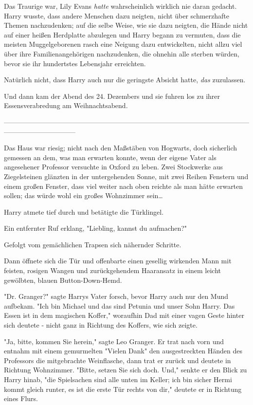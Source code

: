 {Das Traurige war, Lily Evans \emph{hatte} wahrscheinlich wirklich nie daran gedacht. Harry wusste, dass andere Menschen dazu neigten, nicht über schmerzhafte Themen nachzudenken; auf die selbe Weise, wie sie dazu neigten, die Hände nicht auf einer heißen Herdplatte abzulegen und Harry begann zu vermuten, dass die meisten Muggelgeborenen rasch eine Neigung dazu entwickelten, nicht allzu viel über ihre Familienangehörigen nachzudenken, die ohnehin alle sterben würden, bevor sie ihr hundertstes Lebensjahr erreichten.

Natürlich nicht, dass Harry auch nur die geringste Absicht hatte, \emph{das} zuzulassen.

Und dann kam der Abend des 24. Dezembers und sie fuhren los zu ihrer Essensverabredung am Weihnachtsabend.

--------------------------------------------------------------------------------------------------------------------------------------------

Das Haus war riesig; nicht nach den Maßstäben von Hogwarts, doch sicherlich gemessen an dem, was man erwarten konnte, wenn der eigene Vater als angesehener Professor versuchte in Oxford zu leben. Zwei Stockwerke aus Ziegelsteinen glänzten in der untergehenden Sonne, mit zwei Reihen Fenstern und einem großen Fenster, dass viel weiter nach oben reichte als man hätte erwarten sollen; das würde wohl ein großes Wohnzimmer sein…

Harry atmete tief durch und betätigte die Türklingel.

Ein entfernter Ruf erklang, "Liebling, kannst du aufmachen?"

Gefolgt vom gemächlichen Trapsen sich nähernder Schritte.

Dann öffnete sich die Tür und offenbarte einen gesellig wirkenden Mann mit feisten, rosigen Wangen und zurückgehendem Haaransatz in einem leicht gewölbten, blauen Button-Down-Hemd.

"Dr. Granger?" sagte Harrys Vater forsch, bevor Harry auch nur den Mund aufbekam. "Ich bin Michael und das sind Petunia und unser Sohn Harry. Das Essen ist in dem magischen Koffer," woraufhin Dad mit einer vagen Geste hinter sich deutete - nicht ganz in Richtung des Koffers, wie sich zeigte.

"Ja, bitte, kommen Sie herein," sagte Leo Granger. Er trat nach vorn und entnahm mit einem gemurmelten "Vielen Dank" den ausgestreckten Händen des Professors die mitgebrachte Weinflasche, dann trat er zurück und deutete in Richtung Wohnzimmer. "Bitte, setzen Sie sich doch. Und," senkte er den Blick zu Harry hinab, "die Spielsachen sind alle unten im Keller; ich bin sicher Hermi kommt gleich runter, es ist die erste Tür rechts von dir," deutete er in Richtung eines Flurs.

}
